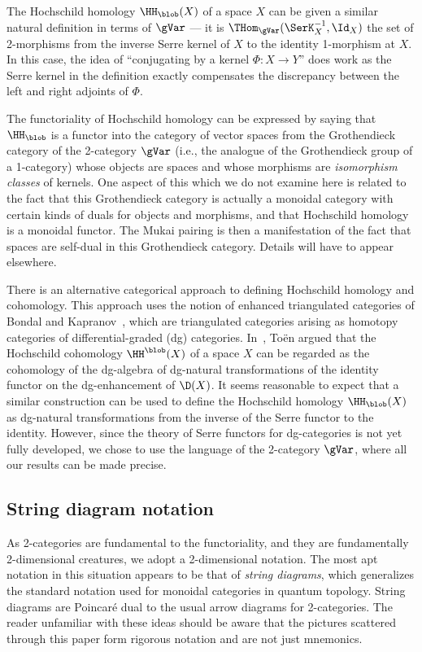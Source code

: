 The Hochschild homology $\HH_\blob(X)$ of a space $X$ can be given a
similar natural definition in terms of $\gVar$ --- it is
$\THom_\gVar(\SerK^{-1}_X,\Id_X)$ the set of 2-morphisms from the
inverse Serre kernel of $X$ to the identity 1-morphism at $X$.
In this case, the idea of ``conjugating by a kernel $\Phi\colon X \to
Y$'' does work as the Serre kernel in the definition exactly
compensates the discrepancy between the left and right adjoints of
$\Phi$.

The functoriality of Hochschild homology can be expressed by saying
that $\HH_\blob$ is a functor into the category of vector spaces from
the Grothen\-dieck category of the 2-category $\gVar$ (i.e., the
analogue of the Grothendieck group of a 1-category) whose objects are
spaces and whose morphisms are \emph{isomorphism classes} of kernels.
One aspect of this which we do not examine here is related to the fact
that this Grothendieck category is actually a monoidal category with
certain kinds of duals for objects and morphisms, and that Hochschild
homology is a monoidal functor.  The Mukai pairing is then a
manifestation of the fact that spaces are self-dual in this
Grothendieck category.  Details will have to appear elsewhere.

There is an alternative categorical approach to defining Hoch\-schild
homology and cohomology.  This approach uses the notion of enhanced
triangulated categories of Bondal and Kapranov~\cite{BonKap}, which
are triangulated categories arising as homotopy categories of
differential-graded (dg) categories.  In~\cite{Toe}, To\"en argued that
the Hochschild cohomology $\HH^\blob(X)$ of a space $X$ can be
regarded as the cohomology of the dg-algebra of dg-natural
transformations of the identity functor on the dg-enhancement of
$\D(X)$.  It seems reasonable to expect that a similar construction
can be used to define the Hochschild homology $\HH_\blob(X)$ as
dg-natural transformations from the inverse of the Serre functor to
the identity.  However, since the theory of Serre functors for
dg-categories is not yet fully developed, we chose to use the language
of the 2-category $\gVar$, where all our results can be made precise.

\subsection*{String diagram notation}
As 2-categories are fundamental to the functoriality, and they are
fundamentally 2-dimensional creatures, we adopt a 2-dimensional
notation.  The most apt notation in this situation appears to be that
of \emph{string diagrams}, which generalizes the standard notation
used for monoidal categories in quantum topology.  String diagrams are
Poincar\'e dual to the usual arrow diagrams for 2-categories.  The
reader unfamiliar with these ideas should be aware that the pictures
scattered through this paper form rigorous notation and are not just
mnemonics.


